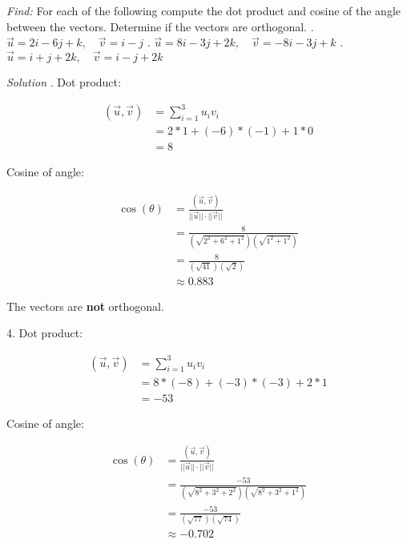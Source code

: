 \documentclass[11pt]{homework}
\begin{document}
\maketitle

\emph{Find:}
\newline
For each of the following compute the dot product and cosine of the 
angle between the vectors. 
Determine if the vectors are orthogonal.
\newline
{}. $\vec u = 2i - 6j + k, \quad \vec v =i-j$
. $\vec u = 8i - 3j +2k, \quad \vec v = -8i -3j +k$
. $\vec u = i + j + 2k,  \quad \vec v = i -j +2k$

\emph{Solution}
. Dot product:

\begin{align*}
(\vec u, \vec v) &= \sum_{i=1}^{3} u_i v_i \\
       &= 2 * 1 +(-6) * (-1) + 1 *0 \\
       &= 8
\end{align*}

Cosine of angle:

\begin{align*}
\cos(\theta) &= \frac{ (\vec u, \vec v)}{  ||\vec u|| \cdot ||\vec v||} \\
             &= \frac{ 8}{  (\sqrt{2^2 + 6^2 + 1^2}) (\sqrt{1^2 + 1^2})} \\
             &= \frac{ 8}{  (\sqrt{41}) (\sqrt{2}) } \\
             &\approx 0.883
\end{align*}

The vectors are \textbf{not} orthogonal.


4. Dot product:

\begin{align*}
(\vec u, \vec v) &= \sum_{i=1}^{3} u_i v_i \\
       &= 8 * (-8) + (-3) * (-3) + 2 *1 \\
       &= -53
\end{align*}

Cosine of angle:
 
\begin{align*}
\cos(\theta) &= \frac{ (\vec u, \vec v)}{  ||\vec u|| \cdot ||\vec v||} \\
             &= \frac{ -53}{  (\sqrt{8^2 + 3^2 + 2^2}) (\sqrt{8^2 + 3^2 + 1^2})} \\
             &= \frac{ -53}{  (\sqrt{77}) (\sqrt{74}) } \\
             &\approx  -0.702
\end{align*}
\end{document}
